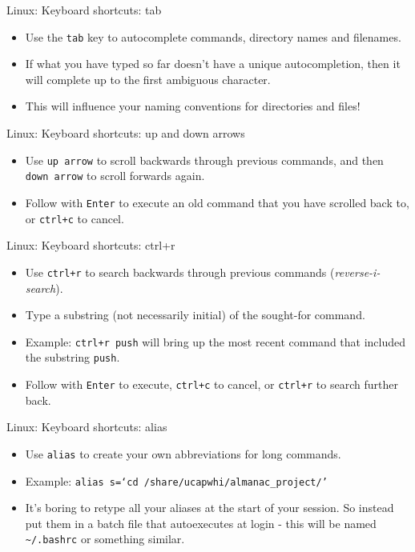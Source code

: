 \documentclass{beamer}
\newcommand{\command}[1]{\colorbox{light-gray}{\texttt{#1}}}
\newcommand{\filename}[1]{\colorbox{light-green}{\texttt{#1}}}
\begin{document}
\begin{frame}{Linux: Keyboard shortcuts: tab}
  \begin{itemize}
    \item{Use the \command{tab} key to autocomplete commands, directory names and filenames.}
    \item{If what you have typed so far doesn't have a unique autocompletion, then it will complete up to the first ambiguous character.}
    \item{This will influence your naming conventions for directories and files!}
  \end{itemize}
\end{frame}

\begin{frame}{Linux: Keyboard shortcuts: up and down arrows}
  \begin{itemize}
    \item{Use \command{up arrow} to scroll backwards through previous commands, and then \command{down arrow} to scroll forwards again.}
    \item{Follow with \command{Enter} to execute an old command that you have scrolled back to, or \command{ctrl+c} to cancel.}
  \end{itemize}
\end{frame}

\begin{frame}{Linux: Keyboard shortcuts: ctrl+r}
  \begin{itemize}
    \item{Use \command{ctrl+r} to search backwards through previous commands (\textit{reverse-i-search}).}
    \item{Type a substring (not necessarily initial) of the sought-for command.}
    \item{Example: \command{ctrl+r push} will bring up the most recent command that included the substring \command{push}.}
    \item{Follow with \command{Enter} to execute, \command{ctrl+c} to cancel, or \command{ctrl+r} to search further back.}
  \end{itemize}
\end{frame}

\begin{frame}{Linux: Keyboard shortcuts: alias}
  \begin{itemize}
    \item{Use \command{alias} to create your own abbreviations for long commands.}
    \item{Example: \command{alias s=`cd /share/ucapwhi/almanac\_project/'}}
    \item{It's boring to retype all your aliases at the start of your session. So instead put them in a batch file that autoexecutes at login - this will be named \filename{\textasciitilde/.bashrc} or something similar. }
  \end{itemize}
\end{frame}
\end{document}
